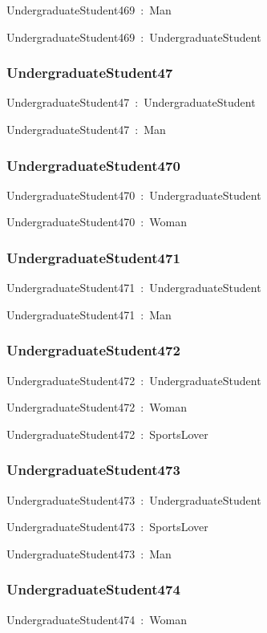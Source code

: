 \documentclass{article}
\begin{document}
UndergraduateStudent469~:~Man

UndergraduateStudent469~:~UndergraduateStudent

\subsubsection*{UndergraduateStudent47}

UndergraduateStudent47~:~UndergraduateStudent

UndergraduateStudent47~:~Man

\subsubsection*{UndergraduateStudent470}

UndergraduateStudent470~:~UndergraduateStudent

UndergraduateStudent470~:~Woman

\subsubsection*{UndergraduateStudent471}

UndergraduateStudent471~:~UndergraduateStudent

UndergraduateStudent471~:~Man

\subsubsection*{UndergraduateStudent472}

UndergraduateStudent472~:~UndergraduateStudent

UndergraduateStudent472~:~Woman

UndergraduateStudent472~:~SportsLover

\subsubsection*{UndergraduateStudent473}

UndergraduateStudent473~:~UndergraduateStudent

UndergraduateStudent473~:~SportsLover

UndergraduateStudent473~:~Man

\subsubsection*{UndergraduateStudent474}

UndergraduateStudent474~:~Woman
\end{document}
